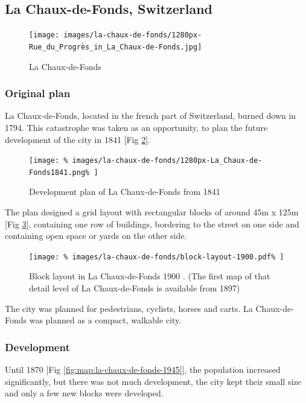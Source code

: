 \documentclass{article}
\begin{document}
		\subsection{La Chaux-de-Fonds, Switzerland}		
		\begin{figure}[H]
	 		\texttt{[image: images/la-chaux-de-fonds/1280px-Rue\_du\_Progrès\_in\_La\_Chaux-de-Fonds.jpg]}
 			\caption{La Chaux-de-Fonds \cite{Wikimedia:RueDuProgressLaChauxDeFonds}}
 			\label{fig:img:la-chaux-de-fonds}
	 	\end{figure}
		
		\begin{multicols}{2}
	      \raggedcolumns
		
			\subsubsection{Original plan}
			La Chaux-de-Fonds, located in the french part of Switzerland, burned down in 1794.
			This catastrophe was taken as an opportunity, to plan the future development of the city in 1841 [Fig \ref{fig:map:plan-la-chaux-de-fonds-1841}].
		
			\begin{figure}[H]
				\texttt{[image: \%
					images/la-chaux-de-fonds/1280px-La\_Chaux-de-Fonds1841.png\%
				]}
				\caption{Development plan of La Chaux-de-Fonds from 1841 \cite{Wikimedia:LaChauxDeFonds1841}}
				\label{fig:map:plan-la-chaux-de-fonds-1841}
			\end{figure}
			
			The plan designed a grid layout with rectangular blocks of around 45m x 125m [Fig \ref{fig:img:la-chaux-de-fonds-block-layout-1900}], containing one row of buildings, bordering to the street on one side and containing open space or yards on the other side.
			
			\begin{figure}[H]
				\texttt{[image: \%
					images/la-chaux-de-fonds/block-layout-1900.pdf\%
				]}
				\caption{Block layout in La Chaux-de-Fonds 1900  \cite{MapGeoAdmin:LaChauxDeFonds}. (The first map of that detail level of La Chaux-de-Fonds is available from 1897)}
				\label{fig:img:la-chaux-de-fonds-block-layout-1900}
			\end{figure}
			
			The city was planned for pedestrians, cyclists, horses and carts.
			La Chaux-de-Fonds was planned as a compact, walkable city.
			
			
			\subsubsection{Development}
			Until 1870 [Fig \ref{fig:map:la-chaux-de-fonds-1945}], the population increased significantly, but there was not much development, the city kept their small size and only a few new blocks were developed.
			

\end{multicols}
\end{document}
